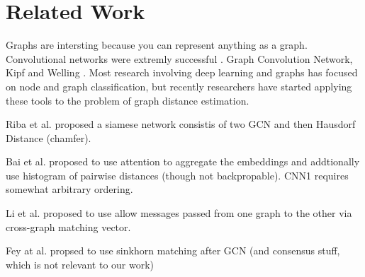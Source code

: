 \section{Related Work}

Graphs are intersting because you can represent anything as a graph.
Convolutional networks were extremly successful \cite{alexnet2012}.
Graph Convolution Network, Kipf and Welling \cite{kipf2017}.
Most research involving deep learning and graphs has focused on node and graph classification, but recently researchers have started applying these tools to the problem of graph distance estimation.

Riba et al. \cite{riba2018} proposed a siamese network consistis of two GCN and then Hausdorf Distance (chamfer).

Bai et al. \cite{bai2019} proposed to use attention to aggregate the embeddings and addtionally use histogram of pairwise distances (though not backpropable).
CNN1 \cite{bai2018_cnn1} \cite{bai2018_cnn2} requires somewhat arbitrary ordering.

Li et al. \cite{li2019} proposed to use allow messages passed from one graph to the other via cross-graph matching vector.

Fey at al. \cite{fey2020_update} propsed to use sinkhorn matching after GCN (and consensus stuff, which is not relevant to our work)
